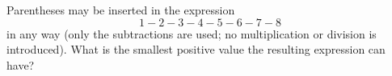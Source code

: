 Parentheses may be inserted in the expression
\[
1-2-3-4-5-6-7-8
\]
in any way (only the subtractions are used; no multiplication or division is introduced). What is the smallest positive value the resulting expression can have?
